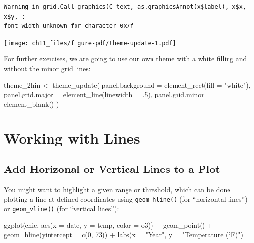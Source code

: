 \documentclass[
  letterpaper,
]{scrbook}
\newenvironment{Shaded}{\begin{snugshade}}{\end{snugshade}}
\newcommand{\AttributeTok}[1]{\textcolor[rgb]{0.40,0.45,0.13}{#1}}
\newcommand{\DecValTok}[1]{\textcolor[rgb]{0.68,0.00,0.00}{#1}}
\newcommand{\FunctionTok}[1]{\textcolor[rgb]{0.28,0.35,0.67}{#1}}
\newcommand{\NormalTok}[1]{\textcolor[rgb]{0.00,0.23,0.31}{#1}}
\newcommand{\OtherTok}[1]{\textcolor[rgb]{0.00,0.23,0.31}{#1}}
\newcommand{\SpecialCharTok}[1]{\textcolor[rgb]{0.37,0.37,0.37}{#1}}
\newcommand{\StringTok}[1]{\textcolor[rgb]{0.13,0.47,0.30}{#1}}
\begin{document}
\begin{verbatim}
Warning in grid.Call.graphics(C_text, as.graphicsAnnot(x$label), x$x, x$y, :
font width unknown for character 0x7f
\end{verbatim}

\texttt{[image: ch11\_files/figure-pdf/theme-update-1.pdf]}

For further exercises, we are going to use our own theme with a white
filling and without the minor grid lines:

\begin{Shaded}
\begin{Highlighting}[]
\NormalTok{theme\_2hin }\OtherTok{\textless{}{-}} \FunctionTok{theme\_update}\NormalTok{(}
  \AttributeTok{panel.background =} \FunctionTok{element\_rect}\NormalTok{(}\AttributeTok{fill =} \StringTok{"white"}\NormalTok{),}
  \AttributeTok{panel.grid.major =} \FunctionTok{element\_line}\NormalTok{(}\AttributeTok{linewidth =}\NormalTok{ .}\DecValTok{5}\NormalTok{),}
  \AttributeTok{panel.grid.minor =} \FunctionTok{element\_blank}\NormalTok{()}
\NormalTok{)}
\end{Highlighting}
\end{Shaded}


\chapter{Working with Lines}\label{lines}

\section{Add Horizonal or Vertical Lines to a
Plot}\label{add-horizonal-or-vertical-lines-to-a-plot}

You might want to highlight a given range or threshold, which can be
done plotting a line at defined coordinates using \texttt{geom\_hline()}
(for ``horizontal lines'') or \texttt{geom\_vline()} (for ``vertical
lines''):

\begin{Shaded}
\begin{Highlighting}[]
\FunctionTok{ggplot}\NormalTok{(chic, }\FunctionTok{aes}\NormalTok{(}\AttributeTok{x =}\NormalTok{ date, }\AttributeTok{y =}\NormalTok{ temp, }\AttributeTok{color =}\NormalTok{ o3)) }\SpecialCharTok{+}
  \FunctionTok{geom\_point}\NormalTok{() }\SpecialCharTok{+}
  \FunctionTok{geom\_hline}\NormalTok{(}\AttributeTok{yintercept =} \FunctionTok{c}\NormalTok{(}\DecValTok{0}\NormalTok{, }\DecValTok{73}\NormalTok{)) }\SpecialCharTok{+}
  \FunctionTok{labs}\NormalTok{(}\AttributeTok{x =} \StringTok{"Year"}\NormalTok{, }\AttributeTok{y =} \StringTok{"Temperature (°F)"}\NormalTok{)}
\end{Highlighting}
\end{Shaded}
\end{document}
